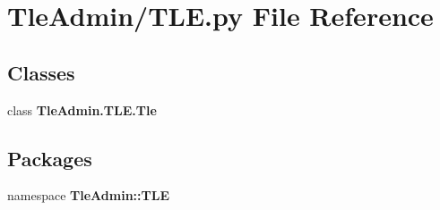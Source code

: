 \section{\-Tle\-Admin/\-T\-L\-E.py \-File \-Reference}
\label{_t_l_e_8py}
\subsection*{\-Classes}
\begin{DoxyCompactItemize}
\item 
class {\bf \-Tle\-Admin.\-T\-L\-E.\-Tle}
\end{DoxyCompactItemize}
\subsection*{\-Packages}
\begin{DoxyCompactItemize}
\item 
namespace {\bf \-Tle\-Admin\-::\-T\-L\-E}
\end{DoxyCompactItemize}
